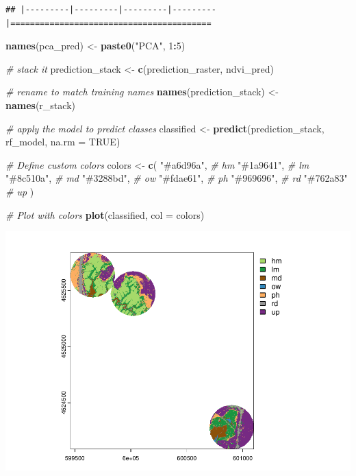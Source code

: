 \documentclass[
]{article}
\newenvironment{Shaded}{\begin{snugshade}}{\end{snugshade}}
\newcommand{\AttributeTok}[1]{\textcolor[rgb]{0.13,0.29,0.53}{#1}}
\newcommand{\CommentTok}[1]{\textcolor[rgb]{0.56,0.35,0.01}{\textit{#1}}}
\newcommand{\ConstantTok}[1]{\textcolor[rgb]{0.56,0.35,0.01}{#1}}
\newcommand{\DecValTok}[1]{\textcolor[rgb]{0.00,0.00,0.81}{#1}}
\newcommand{\FunctionTok}[1]{\textcolor[rgb]{0.13,0.29,0.53}{\textbf{#1}}}
\newcommand{\NormalTok}[1]{#1}
\newcommand{\OtherTok}[1]{\textcolor[rgb]{0.56,0.35,0.01}{#1}}
\newcommand{\SpecialCharTok}[1]{\textcolor[rgb]{0.81,0.36,0.00}{\textbf{#1}}}
\newcommand{\StringTok}[1]{\textcolor[rgb]{0.31,0.60,0.02}{#1}}
\begin{document}
\begin{verbatim}
## |---------|---------|---------|---------|=========================================                                          
\end{verbatim}

\begin{Shaded}
\begin{Highlighting}[]
\FunctionTok{names}\NormalTok{(pca\_pred) }\OtherTok{\textless{}{-}} \FunctionTok{paste0}\NormalTok{(}\StringTok{"PCA"}\NormalTok{, }\DecValTok{1}\SpecialCharTok{:}\DecValTok{5}\NormalTok{)}

\CommentTok{\# stack it}
\NormalTok{prediction\_stack }\OtherTok{\textless{}{-}} \FunctionTok{c}\NormalTok{(prediction\_raster, ndvi\_pred)}

\CommentTok{\# rename to match training names}
\FunctionTok{names}\NormalTok{(prediction\_stack) }\OtherTok{\textless{}{-}} \FunctionTok{names}\NormalTok{(r\_stack)}

\CommentTok{\# apply the model to predict classes}
\NormalTok{classified }\OtherTok{\textless{}{-}} \FunctionTok{predict}\NormalTok{(prediction\_stack, rf\_model, }\AttributeTok{na.rm =} \ConstantTok{TRUE}\NormalTok{)}

\CommentTok{\# Define custom colors}
\NormalTok{colors }\OtherTok{\textless{}{-}} \FunctionTok{c}\NormalTok{(}
  \StringTok{"\#a6d96a"}\NormalTok{,  }\CommentTok{\# hm  }
  \StringTok{"\#1a9641"}\NormalTok{,  }\CommentTok{\# lm  }
  \StringTok{"\#8c510a"}\NormalTok{,  }\CommentTok{\# md  }
  \StringTok{"\#3288bd"}\NormalTok{,  }\CommentTok{\# ow  }
  \StringTok{"\#fdae61"}\NormalTok{,  }\CommentTok{\# ph  }
  \StringTok{"\#969696"}\NormalTok{,  }\CommentTok{\# rd  }
  \StringTok{"\#762a83"}   \CommentTok{\# up  }
\NormalTok{)}



\CommentTok{\# Plot with colors}
\FunctionTok{plot}\NormalTok{(classified, }\AttributeTok{col =}\NormalTok{ colors)}
\end{Highlighting}
\end{Shaded}

\includegraphics{veg_model_files/figure-latex/unnamed-chunk-12-1.pdf}
\end{document}
